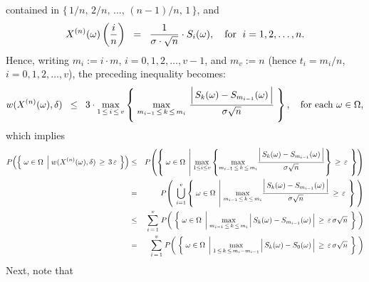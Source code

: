 contained in $\{\,1/n,\, 2/n,\, \ldots,\, (n-1)/n,\, 1\,\}$, and
\begin{equation*}
X^{(n)}(\omega)\left(\dfrac{i}{n}\right)
\;\;=\;\; \dfrac{1}{\sigma\cdot\sqrt{n}}\cdot S_{i}(\omega),
\quad
\textnormal{for \;$i = 1,2,\ldots, n$}.
\end{equation*}
Hence, writing $m_{i} := i\cdot m$, $i = 0, 1, 2, \ldots, v - 1$, and $m_{v} := n$ (hence $t_{i} = m_{i}/n$, $i = 0, 1, 2, \ldots, v$),
the preceding inequality becomes:
\begin{equation*}
	w(X^{(n)}(\omega),\delta) \;\; \leq \;\; 3 \cdot
	\max_{1\,\leq\,i\,\leq\,v}\left\{\;
	\max_{m_{i-1}\,\leq\,k\,\leq\,m_{i}}\,
	\dfrac{\left\vert\,S_{k}(\omega) \overset{{\color{white}.}}{-} S_{m_{i-1}}(\omega)\,\right\vert}{\sigma\sqrt{n}}
	\;\right\},
	\quad
	\textnormal{for each $\omega \in \Omega$},
\end{equation*}
which implies
\begin{eqnarray*}
P\!\left(\left\{\;
	\omega\in\Omega
	\;\left\vert\;
		\overset{{\color{white}1}}{w}(X^{(n)}(\omega),\delta)\,\geq\,3\,\varepsilon
	\right.
\;\right\}\right)
&\leq&
	P\!\left(\left\{\; \omega\in\Omega \;\left\vert\;
		\underset{1\leq i \leq v}{\max}\left\{
		\underset{m_{i-1}\,\leq\,k\,\leq\,m_{i}}{\max}
			\dfrac{\left\vert\, S_{k}(\omega) \overset{{\color{white}.}}{-} S_{m_{i-1}}(\omega) \,\right\vert}{\sigma\sqrt{n}}
		\right\}
		\,\geq\,\varepsilon
		\right.\;\right\}\right)
\\
&=&
	P\!\left(\;\,\overset{v}{\underset{i=1}{\bigcup}}\left\{\; \omega\in\Omega \;\left\vert\;
		\underset{m_{i-1}\,\leq\,k\,\leq\,m_{i}}{\max}
			\dfrac{\left\vert\, S_{k}(\omega) \overset{{\color{white}.}}{-} S_{m_{i-1}}(\omega) \,\right\vert}{\sigma\sqrt{n}}
		\,\geq\,\varepsilon
		\right.\;\right\}
		\;\right)
\\
&\leq& \overset{v}{\underset{i\,=\,1}{\sum}}\;
	P\!\left(\;\left\{\; \omega\in\Omega \;\left\vert\;
		\underset{m_{i-1}\,\leq\,k\,\leq\,m_{i}}{\max}
			\left\vert\, S_{k}(\omega) \overset{{\color{white}.}}{-} S_{m_{i-1}}(\omega) \,\right\vert
		\,\geq\,\varepsilon\,\sigma\sqrt{n}
		\right.\;\right\}
		\;\right)
\\
&=& \overset{v}{\underset{i\,=\,1}{\sum}}\;
	P\!\left(\;\left\{\; \omega\in\Omega \;\left\vert\;
		\underset{1\,\leq\,k\,\leq\,m_{i}-m_{i-1}}{\max}
			\left\vert\, S_{k}(\omega) \overset{{\color{white}.}}{-} S_{0}(\omega) \,\right\vert
		\,\geq\,\varepsilon\,\sigma\sqrt{n}
		\right.\;\right\}
		\;\right)
\end{eqnarray*}
Next, note that
